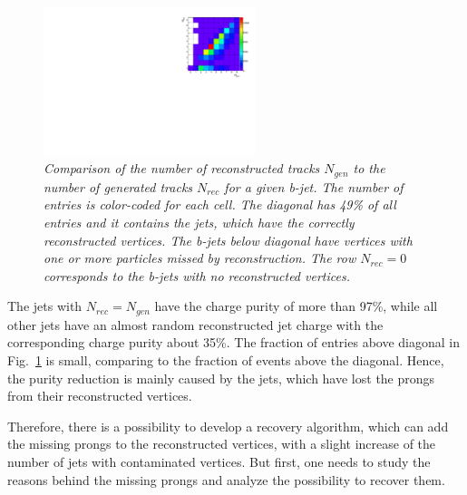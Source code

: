 \begin{figure}[h]
{\centering
    \includegraphics[width=0.55\textwidth]{ILD/plots/rec-gen-table.pdf}
    \caption{\sl Comparison of the number of reconstructed tracks $N_{gen}$ to the number of generated tracks $N_{rec}$ for a given b-jet. The number of entries is color-coded for each cell. The diagonal has 49\% of all entries and it contains the jets, which have the correctly reconstructed vertices. The b-jets below diagonal have vertices with one or more particles missed by reconstruction. The row $N_{rec} = 0$ corresponds to the b-jets with no reconstructed vertices. %
    }
    \label{fig:Table_3}
  }
\end{figure}

The jets with $N_{rec}=N_{gen}$ have the charge purity of more than 97\%, while all other jets have an almost random reconstructed jet charge with the corresponding charge purity about 35\%.
The fraction of entries above diagonal in Fig.~\ref{fig:Table_3} is small, comparing to the fraction of events above the diagonal. 
Hence, the purity reduction is mainly caused by the jets, which have lost the prongs from their reconstructed vertices. 


Therefore, there is a possibility to develop a recovery algorithm, which can add the missing prongs to the reconstructed vertices, with a slight increase of the number of jets with contaminated vertices. 
But first, one needs to study the reasons behind the missing prongs and analyze the possibility to recover them. 

